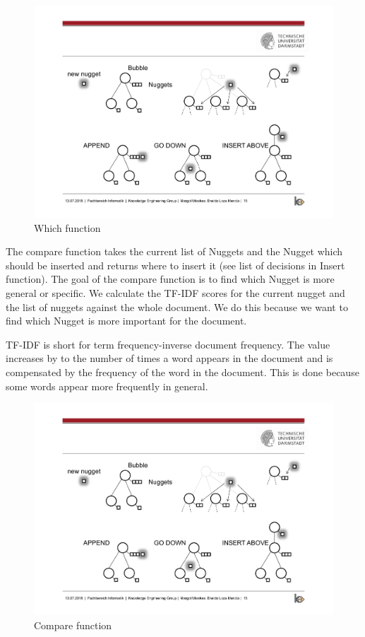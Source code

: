 \begin{figure}[H]
	\centering
	\includegraphics[trim=14cm 10cm 7cm 5.5cm, clip=true]{img/step2_func.pdf}
	\caption{Which function}
	\label{fig:which}
\end{figure}


The compare function takes the current list of Nuggets and the Nugget which should be inserted and returns where to insert it (see list of decisions in Insert function). The goal of the compare function is to find which Nugget is more general or specific. We calculate the TF-IDF scores for the current nugget and the list of nuggets against the whole document. We do this because we want to find which Nugget is more important for the document.

TF-IDF is short for term frequency-inverse document frequency. The value increases by to the number of times a word appears in the document and is compensated by the frequency of the word in the document. This is done because some words appear more frequently in general. 

\begin{figure}[H]
	\centering
	\includegraphics[trim=22.5cm 12.5cm 2.5cm 5.5cm, clip=true]{img/step2_func.pdf}
	\caption{Compare function}
	\label{fig:compare}
\end{figure}


